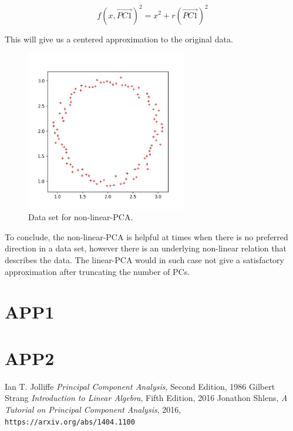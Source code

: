 \documentclass[10pt,twocolumn]{article}
\begin{document}
\begin{equation}
f(x, \vec{PC1})^2 = x^2 + r(\vec{PC1})^2
\end{equation}

This will give us a centered approximation to the original data. 

\begin{figure}[H]
\centering\includegraphics[width=7cm]{../python/PCA-fake-datasets/PCA_nonlinear_scatter_2.png}
\caption{Data set for non-linear-PCA.}			
\label{fig:nonlinear_PCA_data}
\end{figure}

To conclude, the non-linear-PCA is helpful at times when there is no preferred direction in a data set, however there is an underlying non-linear relation that describes the data. The linear-PCA would in such case not give a satisfactory approximation after truncating the number of PCs. 




\appendix

\section{APP1} \label{app:A}

\section{APP2} \label{app:B}

\thebibliography{}

 Ian T. Jolliffe \textit{Principal Component Analysis}, Second Edition, 1986
 Gilbert Strang \textit{Introduction to Linear Algebra}, Fifth Edition, 2016
 Jonathon Shlens, \textit{A Tutorial on Principal Component Analysis}, 2016, \texttt{https://arxiv.org/abs/1404.1100}

 \label{bib:pope}
\end{document}
